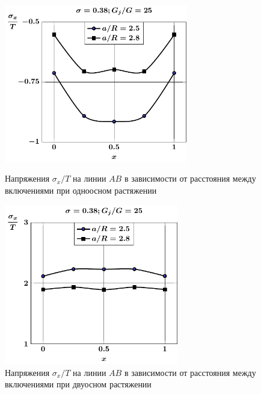 \begin{russian}
\begin{figure}[h!]
\centering\footnotesize
\parbox[b]{7.5cm}{\centering\includegraphics[width=8cm]{periodic-spheres-inc27-a-g25-t1-sig_x.pdf}
\caption{Напряжения $\sigma_x/T$ на линии $AB$ в зависимости от расстояния между включениями при одноосном растяжении
\label{f:11:12}}}\hfil\hfil
\parbox[b]{7.5cm}{\centering\includegraphics[width=7.6cm]{periodic-spheres-inc27-a-g25-t2-sig_x.pdf}
\caption{Напряжения $\sigma_x/T$ на линии $AB$ в зависимости от расстояния между включениями при двуосном растяжении
\label{f:11:13}}}
\end{figure}


\end{russian}
